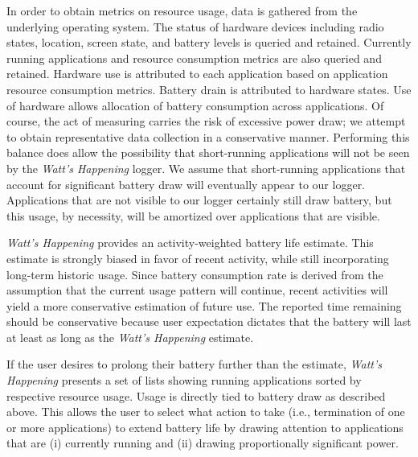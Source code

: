 In order to obtain metrics on resource usage, data is gathered from the underlying operating system.
The status of hardware devices including radio states, location, screen state, and battery levels is queried and retained.
Currently running applications and resource consumption metrics are also queried and retained. 
Hardware use is attributed to each application based on application resource consumption metrics. 
Battery drain is attributed to hardware states.
Use of hardware allows allocation of battery consumption across applications.
Of course, the act of measuring carries the risk of excessive power draw; we attempt to obtain representative data collection in a conservative manner.
Performing this balance does allow the possibility that short-running applications will not be seen by the \emph{Watt's Happening} logger.
We assume that short-running applications that account for significant battery draw will eventually appear to our logger.
Applications that are not visible to our logger certainly still draw battery, but this usage, by necessity, will be amortized over applications that are visible.

\emph{Watt's Happening} provides an activity-weighted battery life estimate.
This estimate is strongly biased in favor of recent activity, while still incorporating long-term historic usage. 
Since battery consumption rate is derived from the assumption that the current usage pattern will continue, recent activities will yield a more conservative estimation of future use.
The reported time remaining should be conservative because user expectation dictates that the battery will last at least as long as the \emph{Watt's Happening} estimate.

If the user desires to prolong their battery further than the estimate, \emph{Watt's Happening} presents a set of lists showing running applications sorted by respective resource usage.
Usage is directly tied to battery draw as described above. 
This allows the user to select what action to take (i.e., termination of one or more applications) to extend battery life by drawing attention to applications that are (i) currently running and (ii) drawing proportionally significant power.






